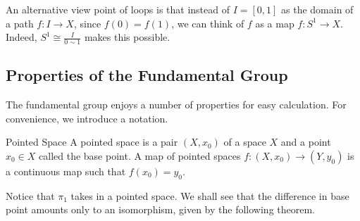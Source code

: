 \documentclass[a4paper]{article}
\begin{document}
An alternative view point of loops is that instead of $I=[0,1]$ as the domain of a path $f:I\to X$, since $f(0)=f(1)$, we can think of $f$ as a map $f:S^1\to X$. Indeed, $S^1\cong\frac{I}{0\sim 1}$ makes this possible. 

\subsection{Properties of the Fundamental Group}
The fundamental group enjoys a number of properties for easy calculation. For convenience, we introduce a notation. 

\begin{defn}{Pointed Space}{} A pointed space is a pair $(X,x_0)$ of a space $X$ and a point $x_0\in X$ called the base point. A map of pointed spaces $f:(X,x_0)\to(Y,y_0)$ is a continuous map such that $f(x_0)=y_0$. 
\end{defn}

Notice that $\pi_1$ takes in a pointed space. We shall see that the difference in base point amounts only to an isomorphism, given by the following theorem. 
\end{document}
